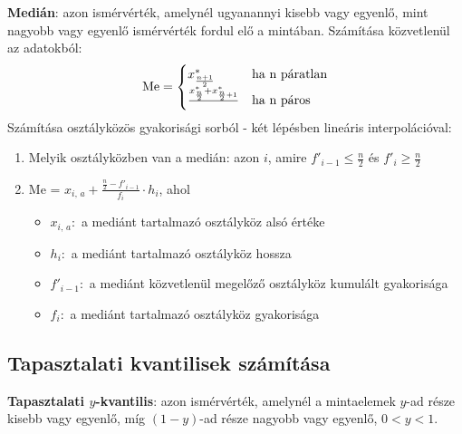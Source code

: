 \documentclass[12pt]{article}
\begin{document}
    \textbf{Medián}: azon ismérvérték, amelynél ugyanannyi kisebb vagy egyenlő, mint nagyobb vagy egyenlő ismérvérték fordul elő a mintában. Számítása közvetlenül az adatokból:
    \[
        \text{Me} =
        \begin{cases}
            x^*_{\frac{n+1}{2}} & \text{ha } $n$ \text{ páratlan} \\
            \frac{x^*_\frac{n}{2} + x^*_{\frac{n}{2} + 1} }{} & \text{ha } $n$ \text{ páros} \\
        \end{cases}
    \]
    Számítása osztályközös gyakorisági sorból - két lépésben lineáris interpolációval:
    \begin{enumerate}
        \item Melyik osztályközben van a medián: azon $i$, amire $f'_{i-1} \leq \frac{n}{2}$ és $f'_i \geq \frac{n}{2}$
        \item Me = $\displaystyle x_{i, \, a} + \frac{\frac{n}{2} - f'_{i-1}}{f_i} \cdot h_i$, ahol
        \begin{itemize}
            \item $x_{i, \, a}:$ a mediánt tartalmazó osztályköz alsó értéke
            \item $h_i:$ a mediánt tartalmazó osztályköz hossza
            \item $f'_{i-1}:$ a mediánt közvetlenül megelőző osztályköz kumulált gyakorisága
            \item $f_i:$ a mediánt tartalmazó osztályköz gyakorisága
        \end{itemize}
    \end{enumerate}

    \subsection{Tapasztalati kvantilisek számítása}
    \textbf{Tapasztalati $y$-kvantilis}: azon ismérvérték, amelynél a mintaelemek $y$-ad része kisebb vagy egyenlő, míg $(1-y)$-ad része nagyobb vagy egyenlő, $0 < y < 1$.\\
\end{document}
